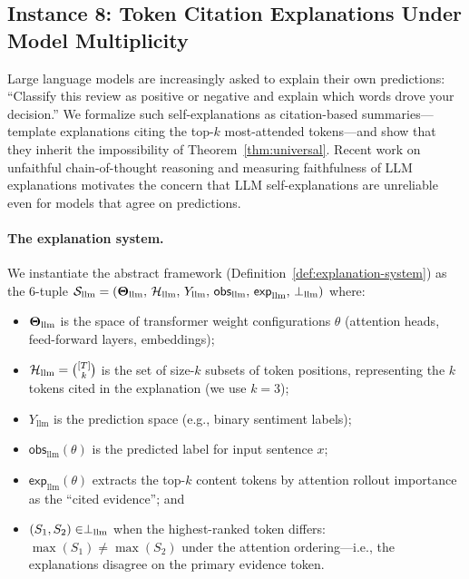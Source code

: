 \subsection{Instance 8: Token Citation Explanations Under Model Multiplicity}
\label{sec:instance-llm}

Large language models are increasingly asked to explain their own
predictions: ``Classify this review as positive or negative and explain
which words drove your decision.''  We formalize such self-explanations
as citation-based summaries---template explanations citing the top-$k$
most-attended tokens---and show that they inherit the impossibility of
Theorem~\ref{thm:universal}.  Recent work on unfaithful chain-of-thought
reasoning \citep{turpin2024language} and measuring faithfulness of LLM
explanations \citep{lanham2023measuring} motivates the concern that LLM
self-explanations are unreliable even for models that agree on predictions.

\paragraph{The explanation system.}
We instantiate the abstract framework
(Definition~\ref{def:explanation-system}) as the 6-tuple
$\mathcal{S}_{\mathrm{llm}} = (\mathbf{\Theta}_{\mathrm{llm}},\,
\mathcal{H}_{\mathrm{llm}},\,Y_{\mathrm{llm}},\,\mathsf{obs}_{\mathrm{llm}},\,
\mathsf{exp}_{\mathrm{llm}},\,\perp_{\mathrm{llm}})$ where:
\begin{itemize}
  \item $\mathbf{\Theta}_{\mathrm{llm}}$ is the space of transformer weight
    configurations $\theta$ (attention heads, feed-forward layers, embeddings);
  \item $\mathcal{H}_{\mathrm{llm}} = \binom{[T]}{k}$ is the set of size-$k$
    subsets of token positions, representing the $k$ tokens cited in the
    explanation (we use $k = 3$);
  \item $Y_{\mathrm{llm}}$ is the prediction space (e.g., binary sentiment
    labels);
  \item $\mathsf{obs}_{\mathrm{llm}}(\theta)$ is the predicted label for
    input sentence $x$;
  \item $\mathsf{exp}_{\mathrm{llm}}(\theta)$ extracts the top-$k$ content
    tokens by attention rollout importance as the ``cited evidence''; and
  \item $(S_1, S_2) \in \perp_{\mathrm{llm}}$ when
    the highest-ranked token differs: $\max(S_1) \neq \max(S_2)$ under
    the attention ordering---i.e., the explanations disagree on the primary
    evidence token.
\end{itemize}


